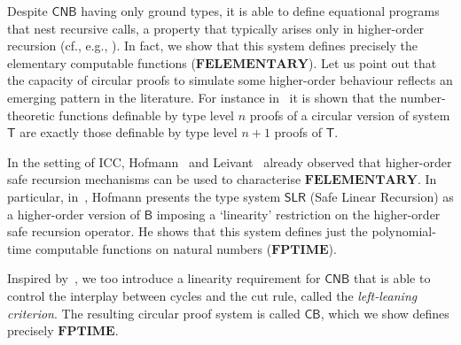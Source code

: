 \documentclass[manuscript,screen]{acmart}
\newcommand{\red}[1]{{\color{red}#1}}
\newcommand{\gianluca}[1]{\todo{G: #1}}
\theoremstyle{definition}
\theoremstyle{remark}
\newcommand{\ptime}{\mathbf{PTIME}}
\newcommand{\elementary}{\mathbf{ELEMENTARY}}
\newcommand{\f}{\mathbf{F}}
\newcommand{\fptime}{\f\ptime}
\newcommand{\felementary}{\f\elementary}
\newcommand{\bc}{\mathsf{B}}
\newcommand{\nested}{\mathsf{N}}
\newcommand{\nbc}{\nested\bc}
\newcommand{\cyclic}{\mathsf{C}}
\newcommand{\cbc}{\cyclic\bc}
\newcommand{\ncbc}{\cyclic\nested\bc}
\newcommand{\slr}{\mathsf{SLR}}
\newcommand{\tgodel}{\mathsf{T}}
\begin{document}
Despite $\ncbc$ having only ground types, it is able to define equational programs that nest   recursive calls, a property that  typically  arises only in higher-order recursion (cf., e.g., \cite{Hofmann97,Leivant99}).  
In fact, we show that this system defines precisely the elementary computable functions ($\felementary$).
Let us point out that the capacity of circular proofs to simulate some higher-order behaviour reflects an emerging pattern in the literature. 
For instance in~\cite{Das2021,Das2021-preprint} it is  shown that the number-theoretic functions definable by type level $n$  proofs of a circular version of system  $\tgodel$ are exactly those definable by  type level $n+1$ proofs of $\tgodel$. 

In the setting of ICC, Hofmann~\cite{Hofmann97} and Leivant~\cite{Leivant99} already observed that higher-order safe recursion mechanisms can be used to characterise $\felementary$. 
In particular, in~\cite{Hofmann97}, Hofmann presents the type system $\slr$ (Safe Linear Recursion) as a higher-order version of $\bc$  imposing a `linearity' restriction on the higher-order safe recursion operator. 
He shows that this system defines just the polynomial-time computable functions on natural numbers ($\fptime$). 

Inspired by~\cite{Hofmann97}, we too introduce a linearity requirement for $\ncbc$ that is able to control the interplay between cycles and the cut rule, called the \emph{left-leaning criterion}. 
The resulting circular  proof system is called $\cbc$, which we show defines precisely $\fptime$. 
% 

\end{document}
